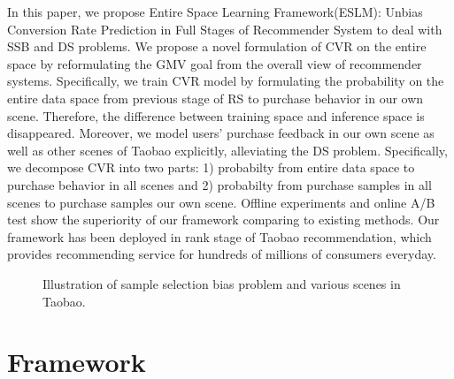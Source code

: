 \documentclass[sigconf]{acmart}
\begin{document}
In this paper, we propose Entire Space Learning Framework(ESLM): Unbias Conversion Rate Prediction in Full Stages of Recommender System to deal with SSB and DS problems. We propose a novel formulation of CVR on the entire space by reformulating the GMV goal from the overall view of recommender systems. 
Specifically, we train CVR model by formulating the probability on the entire data space from previous stage of RS to purchase behavior in our own scene. Therefore, the difference between training space and inference space is disappeared. 
Moreover, we model users’ purchase feedback in our own scene as well as other scenes of Taobao explicitly, alleviating the DS problem. Specifically, we decompose CVR into two parts: 1) probabilty from entire data space to purchase behavior in all scenes and 2) probabilty from purchase samples in all scenes to purchase samples our own scene.
Offline experiments and online A/B test show the superiority of our framework comparing to existing methods. Our framework has been deployed in rank stage of Taobao recommendation, which provides recommending service for hundreds of millions of consumers everyday.

\begin{figure}
\vskip -10pt
\caption{Illustration of sample selection bias problem and various scenes in Taobao.}       
\vskip -15pt
\end{figure}



\section{Framework}
\end{document}
